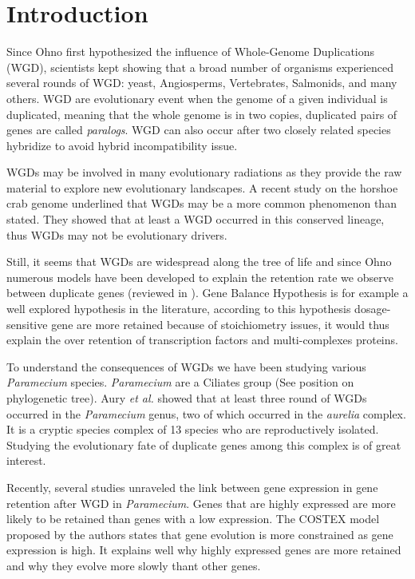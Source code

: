 \section*{Introduction}

Since Ohno first hypothesized the influence of Whole-Genome Duplications (WGD), scientists kept showing that a broad number of organisms experienced several rounds of WGD: yeast, Angiosperms, Vertebrates, Salmonids, and many others. WGD are evolutionary event when the genome of a given individual is duplicated, meaning that the whole genome is in two copies, duplicated pairs of genes are called \textit{paralogs}. WGD can also occur after two closely related species hybridize to avoid hybrid incompatibility issue.

WGDs may be involved in many evolutionary radiations as they provide the raw material to explore new evolutionary landscapes. A recent study on the horshoe crab genome underlined that WGDs may be a more common phenomenon than stated. They showed that at least a WGD occurred in this conserved lineage, thus WGDs may not be evolutionary drivers.

Still, it seems that WGDs are widespread along the tree of life and since Ohno numerous models have been developed to explain the retention rate we observe between duplicate genes (reviewed in ). Gene Balance Hypothesis is for example a well explored hypothesis in the literature, according to this hypothesis dosage-sensitive gene are more retained because of stoichiometry issues, it would thus explain the over retention of transcription factors and multi-complexes proteins.

To understand the consequences of WGDs we have been studying various \textit{Paramecium} species. \textit{Paramecium} are a Ciliates group (See position on phylogenetic tree). Aury \textit{et al.} showed that at least three round of WGDs occurred in the \textit{Paramecium} genus, two of which occurred in the \textit{aurelia} complex. It is a cryptic species complex of 13 species who are reproductively isolated. Studying the evolutionary fate of duplicate genes among this complex is of great interest.

Recently, several studies unraveled the link between gene expression in gene retention after WGD in \textit{Paramecium}. Genes that are highly expressed are more likely to be retained than genes with a low expression. The COSTEX model proposed by the authors states that gene evolution is more constrained as gene expression is high. It explains well why highly expressed genes are more retained and why they evolve more slowly thant other genes.

